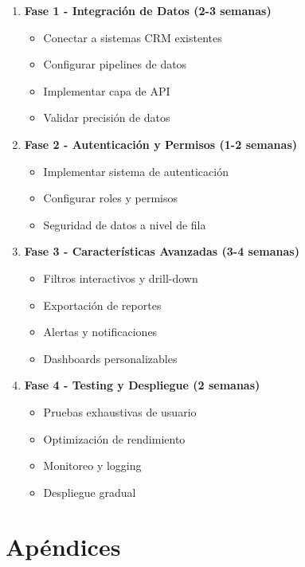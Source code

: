 \documentclass[12pt,a4paper]{article}
\begin{document}
\begin{enumerate}
    \item \textbf{Fase 1 - Integración de Datos (2-3 semanas)}
    \begin{itemize}
        \item Conectar a sistemas CRM existentes
        \item Configurar pipelines de datos
        \item Implementar capa de API
        \item Validar precisión de datos
    \end{itemize}

    \item \textbf{Fase 2 - Autenticación y Permisos (1-2 semanas)}
    \begin{itemize}
        \item Implementar sistema de autenticación
        \item Configurar roles y permisos
        \item Seguridad de datos a nivel de fila
    \end{itemize}

    \item \textbf{Fase 3 - Características Avanzadas (3-4 semanas)}
    \begin{itemize}
        \item Filtros interactivos y drill-down
        \item Exportación de reportes
        \item Alertas y notificaciones
        \item Dashboards personalizables
    \end{itemize}

    \item \textbf{Fase 4 - Testing y Despliegue (2 semanas)}
    \begin{itemize}
        \item Pruebas exhaustivas de usuario
        \item Optimización de rendimiento
        \item Monitoreo y logging
        \item Despliegue gradual
    \end{itemize}
\end{enumerate}

\section{Apéndices}
\end{document}
